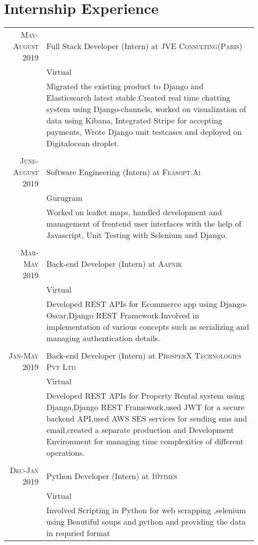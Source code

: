 \documentclass[a4paper,1pt]{article}
\begin{document}
\section{Internship Experience}
\begin{tabular}{r|p{11cm}}

 \textsc{  May-August 2019} & Full Stack Developer (Intern) at \textsc{JVE Consulting(Paris)}\\&{Virtual}\\&\footnotesize{Migrated the existing product to Django and Elasticsearch latest stable.Created real time chatting system using Django-channels, worked on visualization of data using Kibana, Integrated Stripe for accepting payments, Wrote Django unit testcases and deployed on Digitalocean droplet.
}\\\multicolumn{2}{c}{} \\

 \textsc{  June-August 2019} & Software Engineering (Intern) at \textsc{Feasopt.Ai}\\&{Gurugram}\\&\footnotesize{Worked on leaflet maps, handled development and management of frontend user interfaces with the
help of Javascript, Unit Testing with Selenium and Django.
}\\\multicolumn{2}{c}{} \\

 \textsc{  Mar-May 2019} & Back-end Developer (Intern) at \textsc{Aapnik}\\&{Virtual}\\&\footnotesize{Developed REST APIs for Ecommerce app using Django-Oscar,Django REST Framework.Involved in implementation of various concepts such as serializing and managing authentication details.
}\\\multicolumn{2}{c}{} \\

 \textsc{   Jan-May 2019} & Back-end Developer (Intern) at \textsc{ProsperX Technologies Pvt Ltd}\\&{Virtual}\\&\footnotesize{Developed REST APIs for Property Rental system using Django,Django REST Framework,used JWT for a secure backend API,used AWS SES services for sending sms and email,created a separate production and Development Environment for managing time complexities of different operations.}\\\multicolumn{2}{c}{} \\
 
\textsc{Dec-Jan 2019} & Python Developer (Intern) at \textsc{10times}\\&{Virtual}\\&\footnotesize{Involved Scripting in Python for web scrapping ,selenium using Beautiful soups and python and providing the data in requried format}
\end{tabular}\bigskip\par
\end{document}
